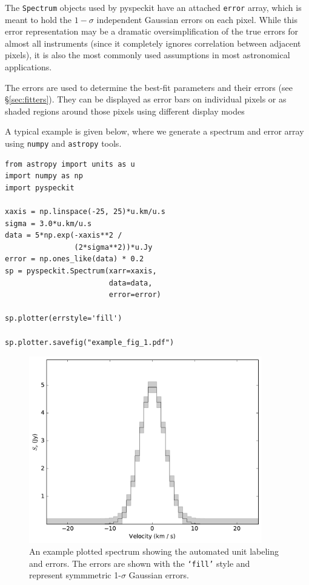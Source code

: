 \documentclass[twocolumn]{aastex61}
\begin{document}


The \texttt{Spectrum} objects used by pyspeckit have an attached \texttt{error}
array, which is meant to hold the $1-\sigma$ independent Gaussian errors on
each pixel.  While this error representation may be a dramatic
oversimplification of the true errors for almost all instruments (since it
completely ignores correlation between adjacent pixels), it is also the most
commonly used assumptions in most astronomical applications.

The errors are used to determine the best-fit parameters and their errors (see
\S \ref{sec:fitters}).  They can be displayed as error bars on individual
pixels or as shaded regions around those pixels using different display modes

A typical example is given below, where we generate a spectrum and error
array using \texttt{numpy} and \texttt{astropy} tools.

\begin{minipage}{\linewidth}
\begin{lstlisting}
from astropy import units as u
import numpy as np
import pyspeckit

xaxis = np.linspace(-25, 25)*u.km/u.s
sigma = 3.0*u.km/u.s
data = 5*np.exp(-xaxis**2 /
                (2*sigma**2))*u.Jy
error = np.ones_like(data) * 0.2
sp = pyspeckit.Spectrum(xarr=xaxis,
                        data=data,
                        error=error)

sp.plotter(errstyle='fill')

sp.plotter.savefig("example_fig_1.pdf")
\end{lstlisting}
\end{minipage}

\begin{figure}[!htp]
\includegraphics[scale=1,width=4in]{example_fig_1.pdf}
\caption{An example plotted spectrum showing the automated unit labeling
and errors.  The errors are shown with the \texttt{`fill'} style
and represent symmmetric 1-$\sigma$ Gaussian errors.  }
\label{fig:example1}
\end{figure}
\end{document}
